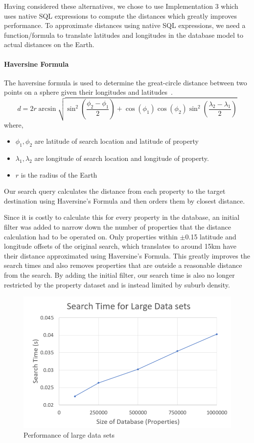 Having considered these alternatives, we chose to use Implementation 3 which uses
native SQL expressions to compute the distances which greatly improves
performance. To approximate distances using native SQL expressions, we need a
function/formula to translate latitudes and longitudes in the database model to
actual distances on the Earth.

\paragraph{Haversine Formula}\label{eq:haversine}
The haversine formula is used to determine the great-circle distance between two
points on a sphere given their longitudes and
latitudes~\parencite{haversine-formula}.
\[
  d = 2r\arcsin{\sqrt{\sin^2\left(\frac{\phi_2 - \phi_1}{2}\right) +
      \cos(\phi_1)\cos(\phi_2)\sin^2\left(\frac{\lambda_2 - \lambda_1}{2}\right)}}
\]
where,
\begin{itemize}
  \item $\phi_1, \phi_2$ are latitude of search location and latitude of property
  \item $\lambda_1, \lambda_2$ are longitude of search location and longitude of
    property.
  \item $r$ is the radius of the Earth
\end{itemize}

Our search query calculates the distance from each property to the target
destination using Haversine's Formula and then orders them by closest distance.

Since it is costly to calculate this for every property in the database, an
initial filter was added to narrow down the number of properties that the
distance calculation had to be operated on.
Only properties within $\pm$0.15 latitude and longitude offsets of the original
search, which translates to around 15km have their distance approximated using
Haversine's Formula. This greatly improves the
search times and also removes properties that are outside a reasonable distance
from the search. By adding the initial filter, our search time is also no longer
restricted by the property dataset and is instead limited by suburb density.

\begin{figure}[!h]
  \includegraphics[width=\linewidth]{assets/performancetest.png}
  \caption{Performance of large data sets}
  \label{fig:performancetest}
\end{figure}

